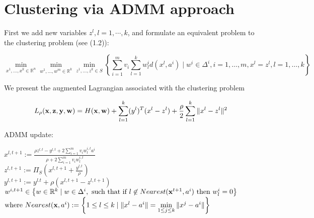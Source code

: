 \documentclass[11pt]{article}
\numberwithin{equation}{section}
\begin{document}
\newpage

\section{Clustering via ADMM approach }

First we add new variables $z^l, l=1, \cdots ,k$, and formulate an equivalent problem to the clustering problem (see (1.2)):

\begin{equation}
	\min\limits_{x^1, \dots ,x^k \in \mathbb{R}^n} \min\limits_{w^1, \dots ,w^m \in \mathbb{R}^k} \min\limits_{z^1, \dots ,z^k \in S} \left\lbrace \sum\limits_{i=1}^{m} v_i \sum\limits_{l=1}^{k} w^i_l d(x^l , a^i) \mid w^i \in \Delta^i , i=1, \dots ,m , x^l = z^l, l=1, \dots ,k \right\rbrace
\end{equation}

We present the augmented Lagrangian associated with the clustering problem

\begin{equation}
	L_\rho({\bf x},{\bf z},{\bf y},{\bf w}) = H({\bf x},{\bf w}) + \sum\limits_{l=1}^k (y^l)^T (x^l -z^l) + \frac{\rho}{2} \sum\limits_{l=1}^k \| x^l -z^l \|^2
\end{equation}

\noindent ADMM update:
\begin{center}
	$x^{l,t+1} := \frac{\rho z^{l,t} - y^{l,t} + 2\sum\limits_{i=1}^m {v_i w^{i,t}_l a^i} }{\rho + 2\sum\limits_{i=1}^m v_i w^{i,t}_l}$ \\ \bigskip
	$z^{l,t+1} := \Pi_S(x^{l,t+1} + \frac{y^{l,t}}{\rho} )$ \\ \bigskip
	$y^{l,t+1} := y^{l.t} + \rho (x^{l,t+1} - z^{l,t+1})$ \\ \bigskip
	$w^{i,t+1} \in \left\lbrace w \in \mathbb{R}^k \mid w \in \Delta^i,\text{ such that if }l \not\in Nearest({\bf x}^{t+1} ,a^i) \text{ then } w^i_l=0 \right\rbrace $
\smallskip
	$\text{where } Nearest({\bf x} ,a^i) := \left\lbrace 1 \leq l \leq k \mid \|x^l -a^i\|= \min\limits_{1 \leq j \leq k} \|x^j - a^i\| \right\rbrace$
\end{center}

\newpage

\noindent



\end{document}
